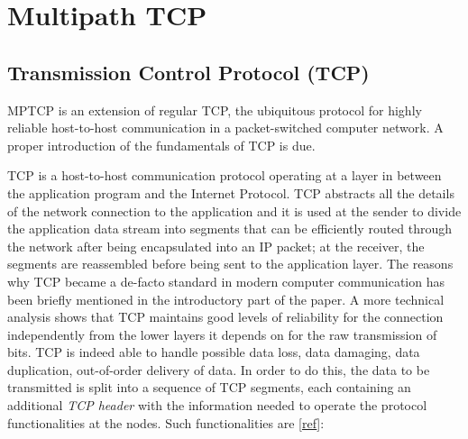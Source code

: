 \chapter{Multipath TCP}
\label{chap:multipathtcp}

\section{Transmission Control Protocol (TCP)}
MPTCP is an extension of regular TCP, the ubiquitous protocol for highly reliable host-to-host communication in a packet-switched computer network. A proper introduction of the fundamentals of TCP is due.


TCP is a host-to-host communication protocol operating at a layer in between the application program and the Internet Protocol. TCP abstracts all the details of the network connection to the application and it is used at the sender to divide the application data stream into segments that can be efficiently routed through the network after being encapsulated into an IP packet; at the receiver, the segments are reassembled before being sent to the application layer.
The reasons why TCP became a de-facto standard in modern computer communication has been briefly mentioned in the introductory part of the paper. A more technical analysis shows that TCP maintains good levels of reliability for the connection independently from the lower layers it depends on for the raw transmission of bits. TCP is indeed able to handle possible data loss, data damaging, data duplication, out-of-order delivery of data. In order to do this, the data to be transmitted is split into a sequence of TCP segments, each containing an additional \textit{TCP header} with the information needed to operate the protocol functionalities at the nodes. Such functionalities are [\href{https://tools.ietf.org/html/rfc793}{ref}]:


